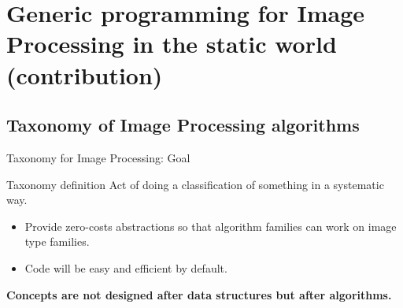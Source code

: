 \documentclass[12pt,aspectratio=169]{beamer}
\begin{document}
%
%
%
\section[Generic Programming for Image Processing in the static world (contribution)]{Generic programming for Image Processing in the static world (contribution)}

\subsection{Taxonomy of Image Processing algorithms}

\begin{frame}{Taxonomy for Image Processing: Goal}
  \begin{alertblock}{Taxonomy definition}
    Act of doing a classification of something in a systematic way.
  \end{alertblock}
  \begin{itemize}
    \item Provide zero-costs abstractions so that algorithm families can work on image type families.
    \item Code will be easy and efficient by default.
  \end{itemize}
  \begin{center}
    \textbf{Concepts are not designed after data structures but after algorithms.}
  \end{center}
\end{frame}
\end{document}
